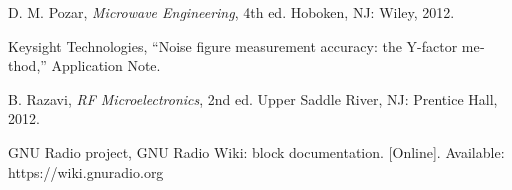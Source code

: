 \documentclass[a4paper,11pt]{article}
\begin{document}
\begin{latin}\small
\begin{enumerate}[label={[\arabic*]},leftmargin=2.2em,itemsep=1pt]
\item D. M. Pozar, \textit{Microwave Engineering}, 4th ed. Hoboken, NJ: Wiley, 2012.
\item Keysight Technologies, ``Noise figure measurement accuracy: the Y-factor method,'' Application Note.
\item B. Razavi, \textit{RF Microelectronics}, 2nd ed. Upper Saddle River, NJ: Prentice Hall, 2012.
\item GNU Radio project, GNU Radio Wiki: block documentation. [Online]. Available: https://wiki.gnuradio.org
\end{enumerate}
\end{latin}
\end{document}
